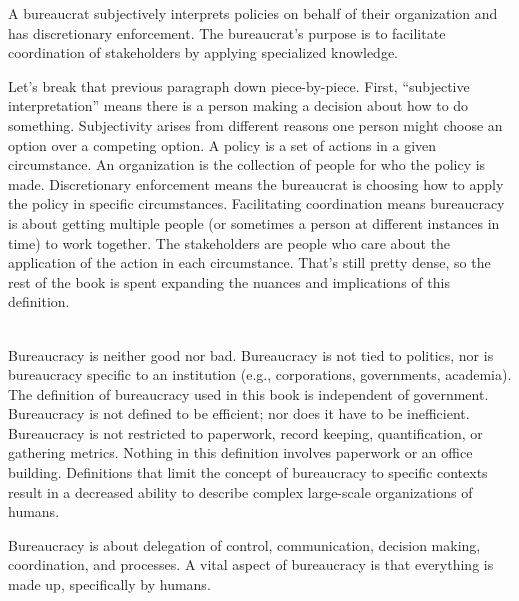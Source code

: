 A \gls{bureaucrat} subjectively interprets policies on behalf of their organization and has discretionary enforcement. The bureaucrat's purpose is to facilitate coordination of stakeholders by applying specialized knowledge. 

Let's break that previous paragraph down piece-by-piece. First, ``subjective interpretation'' means there is a person making a decision about how to do something. Subjectivity arises from different reasons one person might choose an option over a competing option.  A \gls{policy} is a set of actions in a given circumstance. An \gls{organization} is the collection of people for who the policy is made. Discretionary enforcement means the bureaucrat is choosing how to apply the policy in specific circumstances. Facilitating coordination means bureaucracy is about getting multiple people (or sometimes a person at different instances in time) to work together. The stakeholders are people who care about the application of the action in each circumstance.  That's still pretty dense, so the rest of the book is spent expanding the nuances and implications of this definition.

\ \\

Bureaucracy is neither good nor bad. Bureaucracy is not tied to politics, nor is bureaucracy specific to an institution (e.g., corporations, governments, academia). The definition of bureaucracy used in this book is independent of government. Bureaucracy is not defined to be efficient; nor does it have to be inefficient. Bureaucracy is not restricted to paperwork, record keeping, quantification, or gathering metrics. Nothing in this definition involves paperwork or an office building. Definitions that limit the concept of bureaucracy to specific contexts result in a decreased ability to describe complex large-scale organizations of humans. 

Bureaucracy is about delegation of control, communication, decision making, coordination, and processes. 
A vital aspect of bureaucracy is that everything is made up, specifically by humans.



